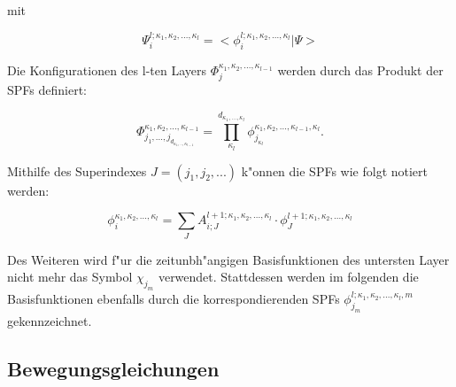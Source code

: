  mit

 \begin{equation}
   \Psi^{l;\kappa_1,\kappa_2,...,\kappa_l}_{i} = < \phi^{l;\kappa_1,\kappa_2,...,\kappa_l}_{i} | \Psi >
 \label{Eq:SHF}
 \end{equation}


Die Konfigurationen des l-ten Layers $ \Phi^{\kappa_1,\kappa_2,...,\kappa_{l-1}}_j $ werden durch das Produkt der SPFs definiert:

 \begin{equation}
   \Phi^{\kappa_1,\kappa_2,...,\kappa_{l-1}}_{j_1,...,j_{d_{\kappa_1,..,\kappa_{l-1}}}} = \prod_{\kappa_l}^{d_{\kappa_1,...,\kappa_{l}}}
   \phi^{\kappa_1,\kappa_2,...,\kappa_{l-1},\kappa_l}_{j_{\kappa_l}}.
 \label{Eq:bla}
 \end{equation}

 Mithilfe des Superindexes $ J = (j_1, j_2,...) $ k"onnen die SPFs wie folgt notiert werden:

 \begin{equation}
   \phi^{\kappa_1,\kappa_2,...,\kappa_{l}}_i = \sum_J A^{l+1;\kappa_1,\kappa_2,...,\kappa_l}_{i;J}
   \cdot \phi^{l+1;\kappa_1,\kappa_2,...,\kappa_{l}}_J
 \label{Eq:bla}
 \end{equation}

 Des Weiteren wird f"ur die zeitunbh"angigen Basisfunktionen des untersten Layer nicht mehr das Symbol $ \chi_{j_m} $ verwendet.
 Stattdessen werden im folgenden die Basisfunktionen ebenfalls durch die korrespondierenden SPFs $ \phi^{l;\kappa_1,\kappa_2,...,\kappa_{l},m}_{j_m} $
 gekennzeichnet.










\clearpage
 \subsection{Bewegungsgleichungen}
 \label{sec:Bewegungsgleichungen}
